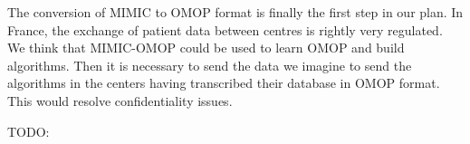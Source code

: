 The conversion of MIMIC to OMOP format is finally the first step in our plan. 
In France, the exchange of patient data between centres is rightly very regulated. 
We think that MIMIC-OMOP could be used to learn OMOP and build algorithms. 
Then it is necessary to send the data we imagine to send the algorithms in the 
centers having transcribed their database in OMOP format. 
This would resolve confidentiality issues.

TODO:

